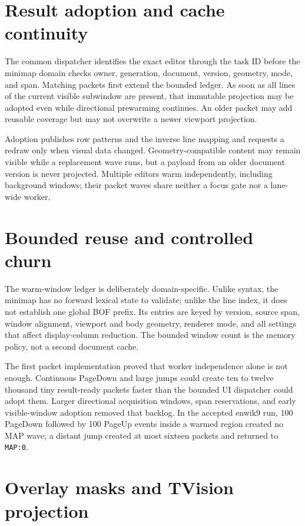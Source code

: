 \documentclass[a4paper,10pt,twoside,openany]{book}
\begin{document}
\section{Result adoption and cache continuity}

The common dispatcher identifies the exact editor through the task ID before
the minimap domain checks owner, generation, document, version, geometry,
mode, and span. Matching packets first extend the bounded ledger. As soon as
all lines of the current visible subwindow are present, that immutable
projection may be adopted even while directional prewarming continues. An
older packet may add reusable coverage but may not overwrite a newer viewport
projection.

Adoption publishes row patterns and the inverse line mapping and requests a
redraw only when visual data changed. Geometry-compatible content may remain
visible while a replacement wave runs, but a payload from an older document
version is never projected. Multiple editors warm independently, including
background windows; their packet waves share neither a focus gate nor a
lane-wide worker.

\section{Bounded reuse and controlled churn}

The warm-window ledger is deliberately domain-specific. Unlike syntax, the
minimap has no forward lexical state to validate; unlike the line index, it
does not establish one global BOF prefix. Its entries are keyed by version,
source span, window alignment, viewport and body geometry, renderer mode, and
all settings that affect display-column reduction. The bounded window count is
the memory policy, not a second document cache.

The first packet implementation proved that worker independence alone is not
enough. Continuous PageDown and large jumps could create ten to twelve
thousand tiny result-ready packets faster than the bounded UI dispatcher could
adopt them. Larger directional acquisition windows, span reservations, and
early visible-window adoption removed that backlog. In the accepted enwik9
run, 100 PageDown followed by 100 PageUp events inside a warmed region created
no MAP wave; a distant jump created at most sixteen packets and returned to
\texttt{MAP:0}.

\section{Overlay masks and TVision projection}
\end{document}
